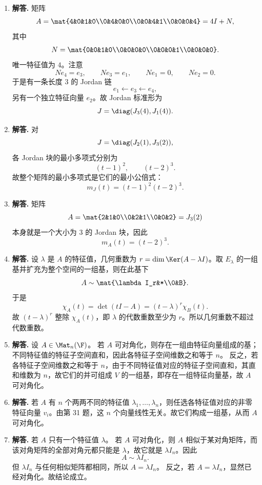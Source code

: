 \begin{enumerate}[label=\textbf{\arabic*.}, leftmargin=*, itemsep=1em]
\item \textbf{解答.} 矩阵
\[
A=\mat{4&0&1&0\\0&4&0&0\\0&0&4&1\\0&0&0&4}
=4I+N,
\]
其中
\[
N=\mat{0&0&1&0\\0&0&0&0\\0&0&0&1\\0&0&0&0}.
\]
唯一特征值为 \(4\)。注意
\[
Ne_4=e_3,\qquad Ne_3=e_1,\qquad Ne_1=0,\qquad Ne_2=0.
\]
于是有一条长度 \(3\) 的 Jordan 链
\[
e_1\leftarrow e_3\leftarrow e_4,
\]
另有一个独立特征向量 \(e_2\)。故 Jordan 标准形为
\[
J=\diag(J_3(4),J_1(4)).
\]

\item \textbf{解答.} 对
\[
J=\diag(J_2(1),J_3(2)),
\]
各 Jordan 块的最小多项式分别为
\[
(t-1)^2,\qquad (t-2)^3.
\]
故整个矩阵的最小多项式是它们的最小公倍式：
\[
m_J(t)=(t-1)^2(t-2)^3.
\]

\item \textbf{解答.} 矩阵
\[
A=\mat{2&1&0\\0&2&1\\0&0&2}=J_3(2)
\]
本身就是一个大小为 \(3\) 的 Jordan 块，因此
\[
m_A(t)=(t-2)^3.
\]

\item \textbf{解答.} 设 \(\lambda\) 是 \(A\) 的特征值，几何重数为 \(r=\dim\Ker(A-\lambda I)\)。取 \(E_\lambda\) 的一组基并扩充为整个空间的一组基，则在此基下
\[
A\sim \mat{\lambda I_r&*\\0&B}.
\]
于是
\[
\chi_A(t)=\det(tI-A)=(t-\lambda)^r\chi_B(t).
\]
故 \((t-\lambda)^r\) 整除 \(\chi_A(t)\)，即 \(\lambda\) 的代数重数至少为 \(r\)。所以几何重数不超过代数重数。

\item \textbf{解答.} 设 \(A\in\Mat_n(\F)\)。  
若 \(A\) 可对角化，则存在一组由特征向量组成的基；不同特征值的特征子空间直和，因此各特征子空间维数之和等于 \(n\)。  
反之，若各特征子空间维数之和等于 \(n\)，由于不同特征值对应的特征子空间直和，其直和维数为 \(n\)，故它们的并可组成 \(V\) 的一组基，即存在一组特征向量基，故 \(A\) 可对角化。

\item \textbf{解答.} 若 \(A\) 有 \(n\) 个两两不同的特征值 \(\lambda_1,\dots,\lambda_n\)，则任选各特征值对应的非零特征向量 \(v_i\)。由第 31 题，这 \(n\) 个向量线性无关。故它们构成一组基，从而 \(A\) 可对角化。

\item \textbf{解答.} 若 \(A\) 只有一个特征值 \(\lambda\)。  
若 \(A\) 可对角化，则 \(A\) 相似于某对角矩阵，而该对角矩阵的全部对角元都只能是 \(\lambda\)，故它就是 \(\lambda I_n\)。因此
\[
A\sim \lambda I_n.
\]
但 \(\lambda I_n\) 与任何相似矩阵都相同，所以 \(A=\lambda I_n\)。  
反之，若 \(A=\lambda I_n\)，显然已经对角化。故结论成立。


\end{enumerate}
